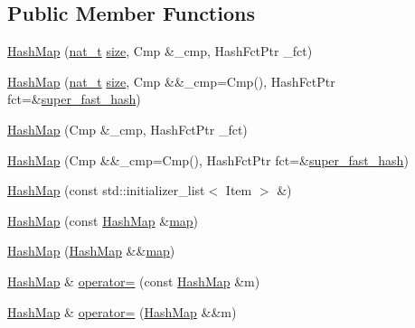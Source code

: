 \subsection*{Public Member Functions}
\begin{DoxyCompactItemize}
\item 
\hyperlink{class_designar_1_1_hash_map_a39b8b365b9399ca72142f522d8d4e877}{Hash\+Map} (\hyperlink{namespace_designar_aa72662848b9f4815e7bf31a7cf3e33d1}{nat\+\_\+t} \hyperlink{class_designar_1_1_hash_set_a0026e1b2caf94d25b554cd6a399f691f}{size}, Cmp \&\+\_\+cmp, Hash\+Fct\+Ptr \+\_\+fct)
\item 
\hyperlink{class_designar_1_1_hash_map_aa82cf8d63637401365bebe4dafe556e2}{Hash\+Map} (\hyperlink{namespace_designar_aa72662848b9f4815e7bf31a7cf3e33d1}{nat\+\_\+t} \hyperlink{class_designar_1_1_hash_set_a0026e1b2caf94d25b554cd6a399f691f}{size}, Cmp \&\&\+\_\+cmp=Cmp(), Hash\+Fct\+Ptr fct=\&\hyperlink{namespace_designar_afd5712d16b3ae1c1c7d59f1004cd96fd}{super\+\_\+fast\+\_\+hash})
\item 
\hyperlink{class_designar_1_1_hash_map_ad1b22ee9f50a5be7febcf622ae8cb31a}{Hash\+Map} (Cmp \&\+\_\+cmp, Hash\+Fct\+Ptr \+\_\+fct)
\item 
\hyperlink{class_designar_1_1_hash_map_ad310e763bce2806e390fde121efe92c6}{Hash\+Map} (Cmp \&\&\+\_\+cmp=Cmp(), Hash\+Fct\+Ptr fct=\&\hyperlink{namespace_designar_afd5712d16b3ae1c1c7d59f1004cd96fd}{super\+\_\+fast\+\_\+hash})
\item 
\hyperlink{class_designar_1_1_hash_map_a3a00fde1b9022f78eabcb90eef446566}{Hash\+Map} (const std\+::initializer\+\_\+list$<$ Item $>$ \&)
\item 
\hyperlink{class_designar_1_1_hash_map_aa59dbb80b0a3d62cde145a84e76bd1bb}{Hash\+Map} (const \hyperlink{class_designar_1_1_hash_map}{Hash\+Map} \&\hyperlink{class_designar_1_1_container_algorithms_a3b9044a197e4ceec6a1de03de197a293}{map})
\item 
\hyperlink{class_designar_1_1_hash_map_a16d4d99bb19bd91ea5700d46d188684b}{Hash\+Map} (\hyperlink{class_designar_1_1_hash_map}{Hash\+Map} \&\&\hyperlink{class_designar_1_1_container_algorithms_a3b9044a197e4ceec6a1de03de197a293}{map})
\item 
\hyperlink{class_designar_1_1_hash_map}{Hash\+Map} \& \hyperlink{class_designar_1_1_hash_map_afaf1bd72c38d70492007bdfd71ae94af}{operator=} (const \hyperlink{class_designar_1_1_hash_map}{Hash\+Map} \&m)
\item 
\hyperlink{class_designar_1_1_hash_map}{Hash\+Map} \& \hyperlink{class_designar_1_1_hash_map_afb0dfc4b02391d050767dc730a73f3c5}{operator=} (\hyperlink{class_designar_1_1_hash_map}{Hash\+Map} \&\&m)

\end{DoxyCompactItemize}
